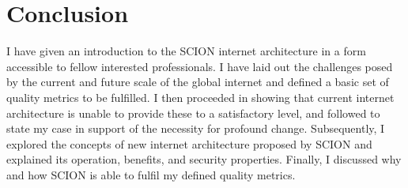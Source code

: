 \documentclass[../eva1_scion.tex]{subfiles}
\begin{document}
    \section{Conclusion}\label{sec:conlusion}
    I have given an introduction to the SCION internet architecture in a form accessible to fellow interested professionals. I have laid out the challenges posed by the current and future scale of the global internet and defined a basic set of quality metrics to be fulfilled. I then proceeded in showing that current internet architecture is unable to provide these to a satisfactory level, and followed to state my case in support of the necessity for profound change. Subsequently, I explored the concepts of new internet architecture proposed by SCION and explained its operation, benefits, and security properties. Finally, I discussed why and how SCION is able to fulfil my defined quality metrics.
\end{document}
